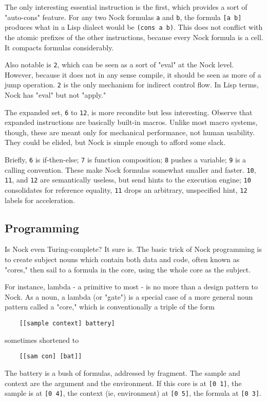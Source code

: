 \documentclass[10pt, nocopyrightspace]{sigplanconf}
\begin{document}
The only interesting essential instruction is the first, which
provides a sort of "auto-cons" feature.  For any two Nock
formulas \verb|a| and \verb|b|, the formula \verb|[a b]| produces what in a
Lisp dialect would be \verb|(cons a b)|.  This does not conflict with
the atomic prefixes of the other instructions, because every
Nock formula is a cell.  It compacts formulas considerably.

Also notable is \verb|2|, which can be seen
as a sort of "eval" at the Nock level.  However, because it does
not in any sense compile, it should be seen as more of a jump
operation.  \verb|2| is the only mechanism for indirect control flow.
In Lisp terms, Nock has "eval" but not "apply."

The expanded set, \verb|6| to \verb|12|, is more recondite but less
interesting.  Observe that expanded instructions are basically
built-in macros.  Unlike most macro systems, though, these are
meant only for mechanical performance, not human usability.  They
could be elided, but Nock is simple enough to afford some slack.

Briefly, \verb|6| is if-then-else; \verb|7| is function
composition; \verb|8| pushes a
variable; \verb|9| is a calling convention.  These make Nock formulas
somewhat smaller and faster.  \verb|10|, \verb|11|, and \verb|12| are semantically
useless, but send hints to the
execution engine; \verb|10| consolidates for reference equality,
\verb|11|
drops an arbitrary, unspecified hint, \verb|12| labels for acceleration.

\subsection{Programming}

Is Nock even Turing-complete?  It sure is.  The basic trick of
Nock programming is to create subject nouns which contain both
data and code, often known as "cores," then sail to a formula in
the core, using the whole core as the subject.

For instance, lambda - a primitive to most - is no more than a
design pattern to Nock.  As a noun, a lambda (or "gate") is a
special case of a more general noun pattern called a "core," 
which is conventionally a triple of the form
\begin{verbatim}
    [[sample context] battery]
\end{verbatim}
sometimes shortened to
\begin{verbatim}
    [[sam con] [bat]]
\end{verbatim}
The battery is a bush of formulas, addressed by fragment.  The
sample and context are the argument and the environment.  If this
core is at \verb|[0 1]|, the sample is at \verb|[0 4]|, the context (ie,
environment) at \verb|[0 5]|, the formula at \verb|[0 3]|.
\end{document}
